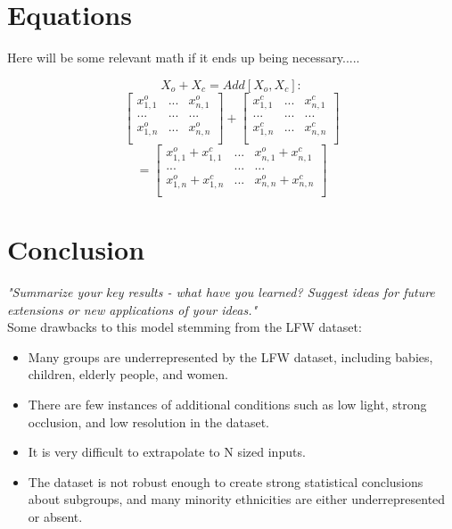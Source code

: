 \documentclass[conference]{IEEEtran}
\begin{document}
\section{Equations}
Here will be some relevant math if it ends up being necessary.....

\begin{equation}
   X_o+X_c = Add[X_o,X_c] :
   \label{eq:2}
\end{equation}
$$
\begin{bmatrix}
x_{1,1}^o & ... & x_{n,1}^o\\
... & ... & ...\\
x_{1,n}^o & ... & x_{n,n}^o\\
\end{bmatrix}
+
\begin{bmatrix}
x_{1,1}^c & ... & x_{n,1}^c\\
... & ... & ...\\
x_{1,n}^c & ... & x_{n,n}^c\\
\end{bmatrix}
$$
$$
=
\begin{bmatrix}
x_{1,1}^o+x_{1,1}^c & ... & x_{n,1}^o+x_{n,1}^c\\
... & ... & ...\\
x_{1,n}^o+x_{1,n}^c & ... & x_{n,n}^o+x_{n,n}^c\\
\end{bmatrix}
$$





\section{Conclusion}

\textit{"Summarize your key results - what have you learned? Suggest ideas for future extensions or new applications of your ideas."}\\

Some drawbacks to this model stemming from the LFW dataset:
\begin{itemize}
    \item Many groups are underrepresented by the LFW dataset, including babies, children, elderly people, and women.
    \item There are few instances of additional conditions such as low light, strong occlusion, and low resolution in the dataset.
    \item It is very difficult to extrapolate to N sized inputs.
    \item The dataset is not robust enough to create strong statistical conclusions about subgroups, and many minority ethnicities are either underrepresented or absent.
\end{itemize}
\end{document}

